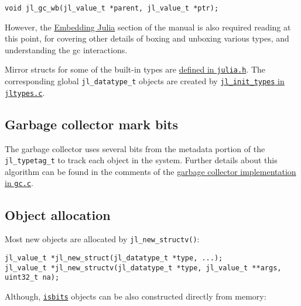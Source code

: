 \begin{lstlisting}
void jl_gc_wb(jl_value_t *parent, jl_value_t *ptr);
\end{lstlisting}



However, the \href{@ref}{Embedding Julia} section of the manual is also required reading at this point, for covering other details of boxing and unboxing various types, and understanding the gc interactions.



Mirror structs for some of the built-in types are \href{https://github.com/JuliaLang/julia/blob/master/src/julia.h}{defined in \texttt{julia.h}}. The corresponding global \texttt{jl\_datatype\_t} objects are created by \href{https://github.com/JuliaLang/julia/blob/master/src/jltypes.c}{\texttt{jl\_init\_types} in \texttt{jltypes.c}}.



\hypertarget{660883080955975432}{}


\subsection{Garbage collector mark bits}



The garbage collector uses several bits from the metadata portion of the \texttt{jl\_typetag\_t} to track each object in the system. Further details about this algorithm can be found in the comments of the \href{https://github.com/JuliaLang/julia/blob/master/src/gc.c}{garbage collector implementation in \texttt{gc.c}}.



\hypertarget{14420252243983980472}{}


\subsection{Object allocation}



Most new objects are allocated by \texttt{jl\_new\_structv()}:




\begin{lstlisting}
jl_value_t *jl_new_struct(jl_datatype_t *type, ...);
jl_value_t *jl_new_structv(jl_datatype_t *type, jl_value_t **args, uint32_t na);
\end{lstlisting}



Although, \hyperlink{12980593021531333073}{\texttt{isbits}} objects can be also constructed directly from memory:




